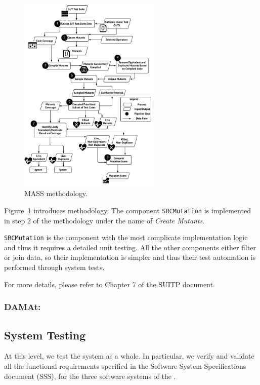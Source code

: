 \begin{figure}[t]
  \centering
  \includegraphics[width=0.6\textwidth]{images/Approach.pdf}
      \caption{MASS methodology.}
      \label{fig:mass}
\end{figure}

Figure~\ref{fig:mass} introduces \MASS methodology. The component \texttt{SRCMutation} is implemented in step 2 of the methodology under the name of \emph{Create Mutants}.

\texttt{SRCMutation} is the component with the most complicate implementation logic and thus it requires a detailed unit testing. All the other components either filter or join data, so their implementation is simpler and thus their test automation is performed through system tests.

For more details, please refer to Chapter 7 of the SUITP document.


\subsubsection{DAMAt: }

\subsection{System Testing}

At this level, we test the system as a whole. In particular, we verify and validate all the functional requirements specified in the Software System Specifications document (SSS), for the three software systems of the \FAQAS.

